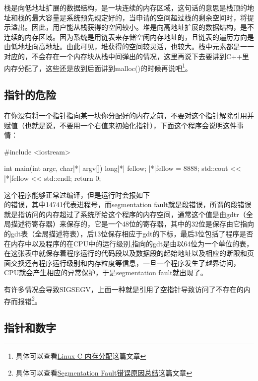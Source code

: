 栈是向低地址扩展的数据结构，是一块连续的内存区域，这句话的意思是栈顶的地址和栈的最大容量是系统预先规定好的，当申请的空间超过栈的剩余空间时，将提示溢出。因此，用户能从栈获得的空间较小。堆是向高地址扩展的数据结构，是不连续的内存区域。因为系统是用链表来存储空闲内存地址的，且链表的遍历方向是由低地址向高地址。由此可见，堆获得的空间较灵活，也较大。栈中元素都是一一对应的，不会存在一个内存块从栈中间弹出的情况，这里再说下去要讲到C++里内存分配了，这些还是放到后面讲到malloc()的时候再说吧\footnote{具体可以查看\thinspace\href{https://www.cnblogs.com/zhaoosheLBJ/p/9281253.html}{Linux C 内存分配}这篇文章}。

\subsection{指针的危险}

在你没有将一个指针指向某一块你分配好的内存之前，不要对这个指针解除引用并赋值（也就是说，不要用一个右值来初始化指针），下面这个程序会说明这件事情：

\begin{cpp}
#include <iostream>

int main(int argc, char|*| argv[]) {
    long|*| fellow;
    |*|fellow = 8888;
    std::cout << |*|fellow << std::endl;
    return 0;
}
\end{cpp}

这个程序能够正常过编译，但是运行时会报如下\\ 的错误，其中14741代表进程号，而segmentation fault就是段错误，所谓的段错误就是指访问的内存超过了系统所给这个程序的内存空间，通常这个值是由gdtr（全局描述符寄存器）来保存的，它是一个48位的寄存器，其中的32位是保存由它指向的gdt表（全局描述符表），后13位保存相应于gdt的下标，最后3位包括了程序是否在内存中以及程序的在CPU中的运行级别,指向的gdt是由以64位为一个单位的表，在这张表中就保存着程序运行的代码段以及数据段的起始地址以及相应的断限和页面交换还有程序运行级别和内存粒度等信息，一旦一个程序发生了越界访问，CPU就会产生相应的异常保护，于是segmentation fault就出现了。

有许多情况会导致SIGSEGV，上面一种就是引用了空指针导致访问了不存在的内存而报错\footnote{具体可以查看\thinspace\href{https://www.cnblogs.com/qiumingcheng/p/11254648.html}{Segmentation Fault错误原因总结}这篇文章}。

\subsection{指针和数字}

